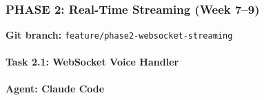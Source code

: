 \documentclass[
  11pt,
]{article}
\newcommand{\passthrough}[1]{#1}
\begin{document}
\hypertarget{phase-2-real-time-streaming-week-79}{%
\subsubsection{PHASE 2: Real-Time Streaming (Week
7--9)}\label{phase-2-real-time-streaming-week-79}}

\textbf{Git branch:}
\passthrough{\lstinline!feature/phase2-websocket-streaming!}

\hypertarget{task-2.1-websocket-voice-handler}{%
\paragraph{Task 2.1: WebSocket Voice
Handler}\label{task-2.1-websocket-voice-handler}}

\textbf{Agent: Claude Code}
\end{document}
